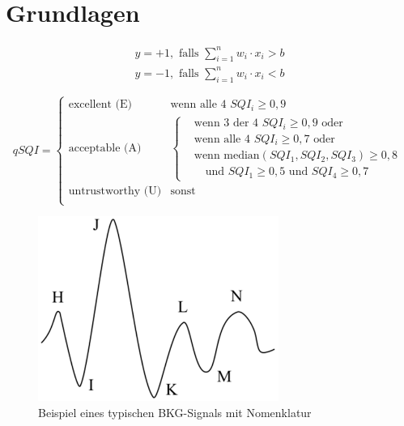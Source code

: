 \chapter{Grundlagen}\label{grundlagen}

\[
\begin{gathered}
	y = +1, \text{ falls } \sum_{i=1}^{n} w_i \cdot x_i > b \\
	y = -1, \text{ falls } \sum_{i=1}^{n} w_i \cdot x_i < b
\end{gathered}
\]

\[
qSQI = \begin{cases}
	\text{excellent (E)} & \text{wenn alle 4 } SQI_i \geq 0,9\\
	\text{acceptable (A)} & \begin{cases}
		& \text{wenn 3 der 4 } SQI_i \geq 0,9 \text{ oder}\\
		& \text{wenn alle 4 } SQI_i \geq 0,7 \text{ oder}\\
		& \text{wenn median}(SQI_1, SQI_2, SQI_3) \geq 0,8\\&\text{ }\text{	und } SQI_1 \geq 0,5 \text{ und } SQI_4 \geq 0,7
		\end{cases}\\
	\text{untrustworthy (U)} & \text{sonst}\\
\end{cases}
\]


\begin{figure}[H]
	\centering
		\includegraphics[width=0.7\textwidth]{pic/bcgWaveform.png}
	\caption[Beispiel eines typischen \ac{BKG}-Signals mit Nomenklatur]{Beispiel eines typischen \ac{BKG}-Signals mit Nomenklatur\protect\footnotemark}
	\label{fig:bcgwaveform}
\end{figure}
